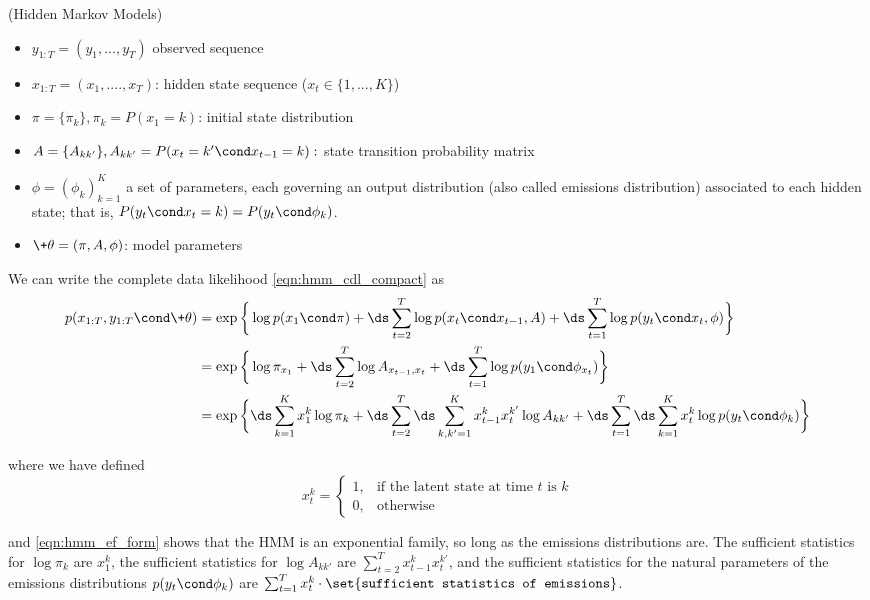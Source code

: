 \documentclass{article} %
\newcommand{\param}{\+\theta}
\newcommand{\state}{x}
\begin{document}
\begin{example}{(Hidden Markov Models)}
\begin{itemize}
\item $y_{1:T}=(y_1, ..., y_T)$ observed sequence
\item $\state_{1:T} =(\state_1, ...., \state_T)$: hidden state sequence ($\state_t \in \{1,...,K \}$) 
\item $\pi = \{ \pi_k \}, \pi_k = P(\state_1 = k)$: initial state distribution
\item $A=\{A_{kk'}\}, A_{kk'} = P(\state_t= k' \cond \state_{t-1}=k):$ state transition probability matrix 
\item $\phi = (\phi_k)_{k=1}^K$ a set of parameters, each governing an output distribution (also called emissions distribution) associated to each hidden state; that is, $ P(y_t \cond \state_t=k) = P(y_t \cond \phi_k)$. 
\item $\param = (\pi, A, \phi)$: model parameters
\end{itemize}


We can write the complete data likelihood \eqref{eqn:hmm_cdl_compact} as
\begin{align}
p(\state_{1:T}, y_{1:T} \cond \param) &=  \exp\bigg \{ \log p(\state_1 \cond \pi) + \ds\sum_{t=2}^T \log p(\state_t \cond \state_{t-1}, A) +  \ds\sum_{t=1}^T \log p(y_t \cond \state_t, \phi) \bigg\}  \nonumber \\
&= \exp \bigg \{ \log \pi_{\state_1}  + \ds\sum_{t=2}^T \log A_{\state_{t-1}, \state_t} + \ds\sum_{t=1}^T \log p(y_1 \cond \phi_{\state_t}) \bigg\} \nonumber \\
&=  \exp\bigg \{  \ds\sum_{k=1}^K \state_1^k \log \pi_k + \ds\sum_{t=2}^T \ds\sum_{k, k'=1}^K \state_{t-1}^k \state_t^{k'} \log A_{kk'} + \ds\sum_{t=1}^T \ds\sum_{k=1}^K \state_t^k \log p(y_t \cond \phi_k)  \bigg\} \label{eqn:hmm_ef_form}
\end{align}

where we have defined
\[ \state_t^k =  
\begin{cases}	  
1, & \text{if the latent state at time $t$ is $k$} \\
0, & \text{otherwise}
\end{cases} \]

and \eqref{eqn:hmm_ef_form} shows that the HMM is an exponential family, so long as the emissions distributions are. 
The sufficient statistics for $\log \pi_k$ are $\state_1^k$, the sufficient statistics for $\log A_{kk'}$ are $\sum_{t=2}^T \state_{t-1}^k \state_t^{k'}$, and the sufficient statistics for the natural parameters of the emissions distributions $p(y_t \cond \phi_k)$ are  $\sum_{t=1}^T \state_{t}^k \cdot \set{\texttt{sufficient statistics of emissions}}$.

\end{example}
\end{document}
